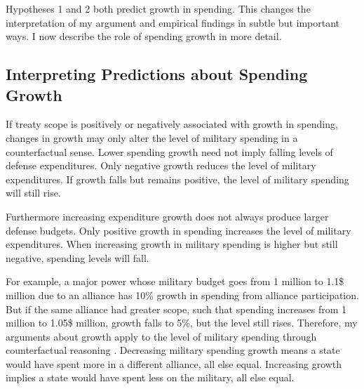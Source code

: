 \documentclass[12pt]{article}
\begin{document}
Hypotheses 1 and 2 both predict growth in spending. 
This changes the interpretation of my argument and empirical findings in subtle but important ways. 
I now describe the role of spending growth in more detail. 


\subsection{Interpreting Predictions about Spending Growth}


If treaty scope is positively or negatively associated with growth in spending, changes in growth may only alter the level of military spending in a counterfactual sense. 
Lower spending growth need not imply falling levels of defense expenditures. 
Only negative growth reduces the level of military expenditures. 
If growth falls but remains positive, the level of military spending will still rise. 


Furthermore increasing expenditure growth does not always produce larger defense budgets. 
Only positive growth in spending increases the level of military expenditures. 
When increasing growth in military spending is higher but still negative, spending levels will fall. 


For example, a major power whose military budget goes from 1 million to 1.1\$ million due to an alliance has 10\% growth in spending from alliance participation. 
But if the same alliance had greater scope, such that spending increases from 1 million to 1.05\$ million, growth falls to 5\%, but the level still rises. 
Therefore, my arguments about growth apply to the level of military spending through counterfactual reasoning \citep{Fearon1991}. 
Decreasing military spending growth means a state would have spent more in a different alliance, all else equal. 
Increasing growth implies a state would have spent less on the military, all else equal.
\end{document}

